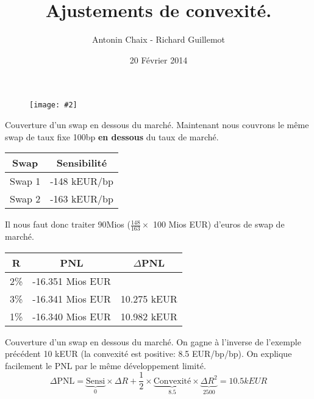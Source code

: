 \documentclass{beamer}
\title[Produits dérivés de taux]{Ajustements de convexité. }
\author{Antonin Chaix - Richard Guillemot}
\institute{Master IFMA}
\date{20 Février 2014}
\newcommand{\FIG}[2]{\texttt{[image: \#2]}}
\begin{document}
\begin{frame}
\titlepage
\begin{figure}[h]
\centering \FIG{5cm}{figures/UPMC_IFMA.jpg}
\end{figure}
\end{frame}

\begin{frame}{Couverture d'un swap en dessous du marché.}
Maintenant nous couvrons le même swap de taux fixe 100bp \textbf{en dessous} du taux de marché.\\
\begin{center}
\begin{tabular}{|c|c|}
\hline
Swap&Sensibilité \\ 
\hline
Swap 1 &-148 kEUR/bp \\ 
Swap 2 &-163 kEUR/bp \\ 
\hline
\end{tabular}
\end{center}
Il nous faut donc traiter 90Mios ($\frac{148}{163} \times$ 100 Mios EUR)  d'euros de swap de marché. 
\begin{center}
\begin{tabular}{|c|c|c|}
\hline
R&PNL&$\Delta$PNL \\ 
\hline
2\% &-16.351 Mios EUR& \\ 
3\% &-16.341 Mios EUR&10.275 kEUR\\ 
1\% &-16.340 Mios EUR&10.982 kEUR\\ 
\hline
\end{tabular}
\end{center}
\end{frame}
\begin{frame}{Couverture d'un swap en dessous du marché.}
On gagne à l'inverse de l'exemple précédent 10 kEUR (la convexité est positive: 8.5 EUR/bp/bp).
On explique facilement le PNL par le même développement limité.
\[
\Delta \text{PNL}=\underbrace{\text{Sensi}}_{0} \times \Delta R + \frac{1}{2} \times \underbrace{\text{Convexité}}_{8.5} \times \underbrace{\Delta R^2}_{2500}=10.5 kEUR
\]
\end{frame}
\end{document}
